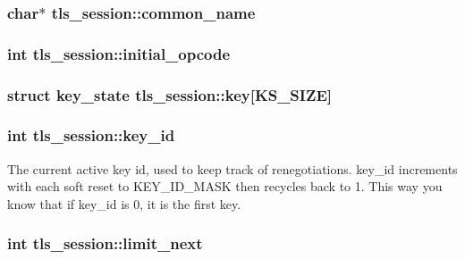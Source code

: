 \subsubsection[{common\+\_\+name}]{\setlength{\rightskip}{0pt plus 5cm}char$\ast$ tls\+\_\+session\+::common\+\_\+name}\label{structtls__session_a83a9f4e9d176b93ca7575ff7e3e30c07}
\hypertarget{structtls__session_add6a01262e483abdb2cf4d6315741e6b}{}
\subsubsection[{initial\+\_\+opcode}]{\setlength{\rightskip}{0pt plus 5cm}int tls\+\_\+session\+::initial\+\_\+opcode}\label{structtls__session_add6a01262e483abdb2cf4d6315741e6b}
\hypertarget{structtls__session_a1de4672c1233dd4887122a909b10c314}{}
\subsubsection[{key}]{\setlength{\rightskip}{0pt plus 5cm}struct {\bf key\+\_\+state} tls\+\_\+session\+::key\mbox{[}{\bf K\+S\+\_\+\+S\+I\+Z\+E}\mbox{]}}\label{structtls__session_a1de4672c1233dd4887122a909b10c314}
\hypertarget{structtls__session_a1255432a61acbfe1b94c15146e9698e0}{}
\subsubsection[{key\+\_\+id}]{\setlength{\rightskip}{0pt plus 5cm}int tls\+\_\+session\+::key\+\_\+id}\label{structtls__session_a1255432a61acbfe1b94c15146e9698e0}
The current active key id, used to keep track of renegotiations. key\+\_\+id increments with each soft reset to K\+E\+Y\+\_\+\+I\+D\+\_\+\+M\+A\+S\+K then recycles back to 1. This way you know that if key\+\_\+id is 0, it is the first key. \hypertarget{structtls__session_a45df56ce77e3c62ce88d6e3cdd743aab}{}
\subsubsection[{limit\+\_\+next}]{\setlength{\rightskip}{0pt plus 5cm}int tls\+\_\+session\+::limit\+\_\+next}\label{structtls__session_a45df56ce77e3c62ce88d6e3cdd743aab}
\hypertarget{structtls__session_a748abaa327fa0bd6a8c23224a06f3a56}{}
